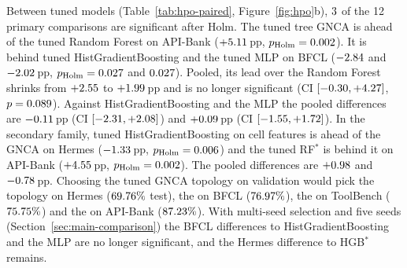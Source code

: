 \documentclass[10pt,twocolumn,letterpaper]{article}
\begin{document}
Between tuned models (Table~\ref{tab:hpo-paired}, Figure~\ref{fig:hpo}b), $3$ of the 12 primary comparisons are significant after Holm. The tuned tree GNCA is ahead of the tuned Random Forest on API-Bank ($+5.11$\,pp, $p_{\text{Holm}}=0.002$). It is behind tuned HistGradientBoosting and the tuned MLP on BFCL ($-2.84$ and $-2.02$\,pp, $p_{\text{Holm}}=0.027$ and $0.027$). Pooled, its lead over the Random Forest shrinks from $+2.55$ to $+1.99$\,pp and is no longer significant (CI $[-0.30, +4.27]$, $p=0.089$). Against HistGradientBoosting and the MLP the pooled differences are $-0.11$\,pp (CI $[-2.31, +2.08]$) and $+0.09$\,pp (CI $[-1.55, +1.72]$). In the secondary family, tuned HistGradientBoosting on cell features is ahead of the GNCA on Hermes ($-1.33$\,pp, $p_{\text{Holm}}=0.006$) and the tuned RF$^\ast$ is behind it on API-Bank ($+4.55$\,pp, $p_{\text{Holm}}=0.002$). The pooled differences are $+0.98$ and $-0.78$\,pp. Choosing the tuned GNCA topology on validation would pick the \numTVsHerModel{} topology on Hermes ($69.76\%$ test), the \numTVsBfclModel{} on BFCL ($76.97\%$), the \numTVsTbModel{} on ToolBench ($75.75\%$) and the \numTVsAbModel{} on API-Bank ($87.23\%$). With multi-seed selection and five seeds (Section~\ref{sec:main-comparison}) the BFCL differences to HistGradientBoosting and the MLP are no longer significant, and the Hermes difference to HGB$^\ast$ remains.
\end{document}
